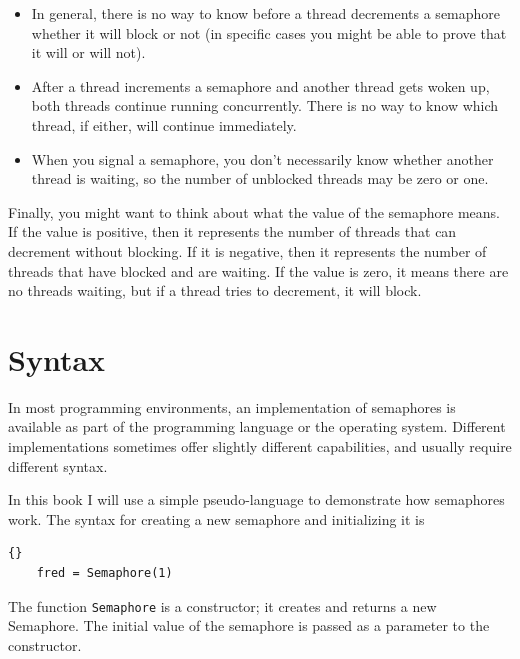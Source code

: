 \documentclass{book}
\begin{document}
\begin{itemize}

\item In general, there is no way to know before a thread decrements a
semaphore whether it will block or not (in specific cases you might
be able to prove that it will or will not).

\item After a thread increments a semaphore and another thread gets
woken up, both threads continue running concurrently.  There is no way
to know which thread, if either, will continue immediately.

\item When you signal a semaphore, you don't necessarily know whether
another thread is waiting, so the number of unblocked threads may
be zero or one.

\end{itemize}

Finally, you might want to think about what the value of the
semaphore means.  If the value is positive, then it represents the
number of threads that can decrement without blocking.  If it
is negative, then it represents the number of threads that have
blocked and are waiting.  If the value is zero, it means there
are no threads waiting, but if a thread tries to decrement, it
will block.


\section{Syntax}

In most programming environments, an implementation of semaphores is
available as part of the programming language or the operating system.
Different implementations sometimes offer slightly different
capabilities, and usually require different syntax.

In this book I will use a simple pseudo-language to demonstrate
how semaphores work.  The syntax for creating a new semaphore
and initializing it is
%
\begin{lstlisting}[caption={Semaphore initialization syntax}]{}
    fred = Semaphore(1)
\end{lstlisting}
%
The function {\tt Semaphore} is a constructor; it creates and
returns a new Semaphore.  The initial value of the semaphore
is passed as a parameter to the constructor.
\end{document}
